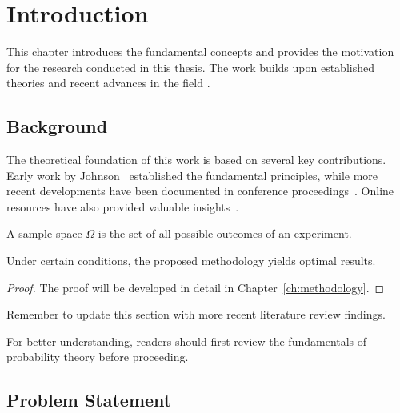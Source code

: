\chapter{Introduction}
\label{ch:introduction}

This chapter introduces the fundamental concepts and provides the motivation for the research conducted in this thesis. The work builds upon established theories and recent advances in the field \cite{textbook2022, sample2023}.

\lipsum[1-2]

\section{Background}
\label{sec:background}

The theoretical foundation of this work is based on several key contributions. Early work by Johnson~\cite{textbook2022} established the fundamental principles, while more recent developments have been documented in conference proceedings~\cite{conference2023}. Online resources have also provided valuable insights~\cite{website2023}.

\begin{definition}
\label{def:sample-space}
A sample space $\Omega$ is the set of all possible outcomes of an experiment.
\end{definition}

\begin{theorem}
\label{thm:main-result}
Under certain conditions, the proposed methodology yields optimal results.
\end{theorem}

\begin{proof}
The proof will be developed in detail in Chapter~\ref{ch:methodology}.
\end{proof}

\lipsum[3-4]

\begin{block}[todo]
Remember to update this section with more recent literature review findings.
\end{block}

\begin{block}[tip]
For better understanding, readers should first review the fundamentals of probability theory before proceeding.
\end{block}

\section{Problem Statement}
\label{sec:problem-statement}

